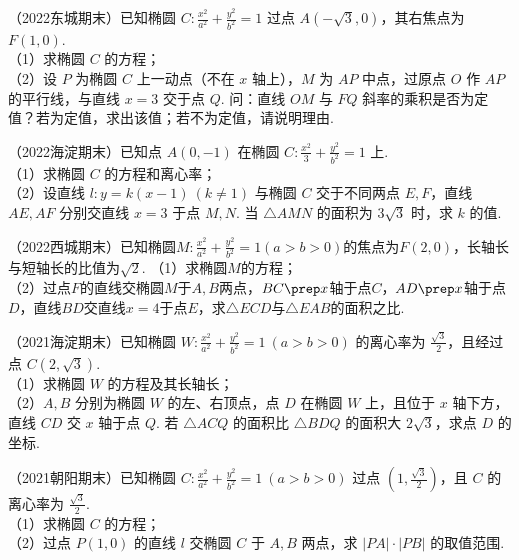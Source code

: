 \begin{example} %
（2022东城期末）已知椭圆 $C:\frac{x^2}{a^2}+\frac{y^2}{b^2}=1$ 过点 $A(-\sqrt{3},0)$，其右焦点为 $F(1,0)$.\\
（1）求椭圆 $C$ 的方程；\\
（2）设 $P$ 为椭圆 $C$ 上一动点（不在 $x$ 轴上），$M$ 为 $AP$ 中点，过原点 $O$ 作 $AP$ 的平行线，与直线 $x=3$ 交于点 $Q$. 问：直线 $OM$ 与 $FQ$ 斜率的乘积是否为定值？若为定值，求出该值；若不为定值，请说明理由.
\end{example}

\begin{example} %
（2022海淀期末）已知点 $A(0,-1)$ 在椭圆 $C:\frac{x^2}{3}+\frac{y^2}{b^2}=1$ 上.\\
（1）求椭圆 $C$ 的方程和离心率；\\
（2）设直线 $l:y=k(x-1)\ (k\neq1)$ 与椭圆 $C$ 交于不同两点 $E,F$，直线 $AE,AF$ 分别交直线 $x=3$ 于点 $M,N$. 当 $\triangle AMN$ 的面积为 $3\sqrt{3}$ 时，求 $k$ 的值.
\end{example}
\begin{example} %
（2022西城期末）已知椭圆$M: \frac{x^2}{a^2} + \frac{y^2}{b^2} = 1(a > b > 0)$的焦点为$F(2, 0)$，长轴长与短轴长的比值为$\sqrt{2}$.
（1）求椭圆$M$的方程；\\
（2）过点$F$的直线交椭圆$M$于$A, B$两点，$BC \prep x$轴于点$C$，$AD \prep x$轴于点$D$，直线$BD$交直线$x = 4$于点$E$，求$\triangle ECD$与$\triangle EAB$的面积之比.
\end{example}


\begin{example} %
（2021海淀期末）已知椭圆 $W:\frac{x^2}{a^2}+\frac{y^2}{b^2}=1\ (a>b>0)$ 的离心率为 $\frac{\sqrt{3}}{2}$，且经过点 $C(2,\sqrt{3})$.\\
（1）求椭圆 $W$ 的方程及其长轴长；\\
（2）$A,B$ 分别为椭圆 $W$ 的左、右顶点，点 $D$ 在椭圆 $W$ 上，且位于 $x$ 轴下方，直线 $CD$ 交 $x$ 轴于点 $Q$. 若 $\triangle ACQ$ 的面积比 $\triangle BDQ$ 的面积大 $2\sqrt{3}$，求点 $D$ 的坐标.
\end{example}

\begin{example} %
（2021朝阳期末）已知椭圆 $C:\frac{x^2}{a^2}+\frac{y^2}{b^2}=1\ (a>b>0)$ 过点 $\left(1,\frac{\sqrt{3}}{2}\right)$，且 $C$ 的离心率为 $\frac{\sqrt{3}}{2}$.\\
（1）求椭圆 $C$ 的方程；\\
（2）过点 $P(1,0)$ 的直线 $l$ 交椭圆 $C$ 于 $A,B$ 两点，求 $\lvert PA\rvert\cdot\lvert PB\rvert$ 的取值范围.
\end{example}

